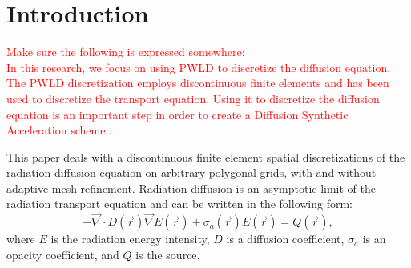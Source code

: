 \documentclass[preprint,10pt]{elsarticle}
\renewcommand{\div}{\vec{\nabla}\! \cdot \!}
\newcommand{\grad}{\vec{\nabla}}
\newcommand{\vr}{\vec{r}}
\newcommand\red{\textcolor{red}}
\renewcommand{\(}{\left(}
\renewcommand{\)}{\right)}
\renewcommand{\[}{\left[}
\renewcommand{\]}{\right]}
\begin{document}

\linenumbers

\section{Introduction} \label{sec:intro}

\red{Make sure the following is expressed somewhere:\\
In this
research, we focus on using PWLD to discretize the diffusion equation. The
PWLD discretization employs discontinuous finite elements and has been used to
discretize the transport equation. Using it to discretize the diffusion
equation is an important step in order to create a Diffusion Synthetic
Acceleration scheme \cite{Adams2002,Wang2010}.
}

This paper deals with a discontinuous finite element spatial discretizations of the radiation 
diffusion equation on arbitrary polygonal grids, with and without adaptive mesh refinement. 
Radiation diffusion is an asymptotic limit of the radiation transport equation and can be 
written in the following form:
\begin{equation} \label{eq:radiation_diffusion}
- \div  D(\vr) \grad E(\vr) + \sigma_a(\vr) E(\vr) = Q(\vr) ,
\end{equation}
where $E$ is the radiation energy intensity, $D$ is a diffusion coefficient, $\sigma_a$ is 
an opacity coefficient, and $Q$ is the source.
\end{document}
